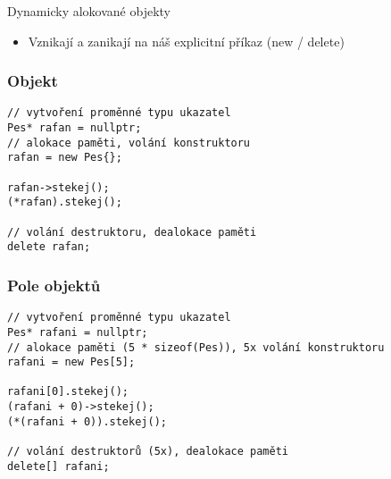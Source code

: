 \begin{frame}
\begin{block}{Dynamicky alokované objekty}
\begin{itemize}
\item Vznikají a zanikají na náš explicitní příkaz (new / delete)
\end{itemize}
\end{block}
\end{frame}


\begin{frame}[fragile]
\frametitle{Objekt}

\begin{yesblock}
\begin{lstlisting}
// vytvoření proměnné typu ukazatel
Pes* rafan = nullptr;
// alokace paměti, volání konstruktoru
rafan = new Pes{};

rafan->stekej();
(*rafan).stekej();

// volání destruktoru, dealokace paměti
delete rafan;
\end{lstlisting}
\end{yesblock}
\end{frame}



\begin{frame}[fragile]
\frametitle{Pole objektů}

\begin{yesblock}
\begin{lstlisting}
// vytvoření proměnné typu ukazatel
Pes* rafani = nullptr;
// alokace paměti (5 * sizeof(Pes)), 5x volání konstruktoru
rafani = new Pes[5];

rafani[0].stekej();
(rafani + 0)->stekej();
(*(rafani + 0)).stekej();

// volání destruktorů (5x), dealokace paměti
delete[] rafani;
\end{lstlisting}
\end{yesblock}
\end{frame}


